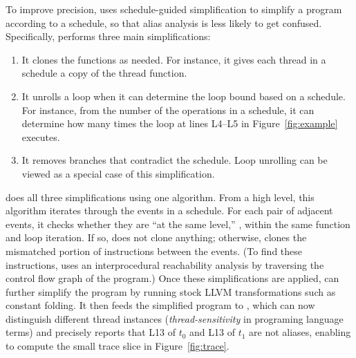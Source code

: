 


To improve precision, \peregrine uses schedule-guided simplification to simplify
a program according to a schedule, so that 
alias analysis is less likely to get confused.  
Specifically, \peregrine performs three main simplifications:

\begin{enumerate}

\item It clones the functions as needed.  For instance, it gives
  each thread in a schedule a copy of the thread function.

\item It unrolls a loop when it can determine the loop bound based on a
  schedule.  For instance, from the number of the 
  operations in a schedule, it can determine how many times the loop at
  lines L4--L5 in Figure~\ref{fig:example} executes.

\item It removes branches that contradict the schedule.  Loop unrolling
  can be viewed as a special case of this simplification.

\end{enumerate}

\peregrine does all three simplifications using one algorithm.  From a high
level, this algorithm iterates through the events in a schedule.  For each
pair of adjacent events, it checks whether they are ``at the same level,''
\ie, within the same function and loop iteration.  If so, \peregrine does
not clone anything; otherwise, \peregrine clones the mismatched portion of
instructions between the events.  (To find these instructions, \peregrine uses an
interprocedural reachability analysis by traversing the control flow graph
of the program.)  Once these simplifications are applied, \peregrine can further
simplify the program by running stock LLVM transformations such as
constant folding.  It then feeds the simplified program to \bddbddb,
which can now
distinguish different thread instances (\emph{thread-sensitivity} in
programing language terms) and precisely reports that L13
of $t_0$ and L13 of $t_1$
are not aliases, enabling \peregrine to compute the small trace slice in
Figure~\ref{fig:trace}.

